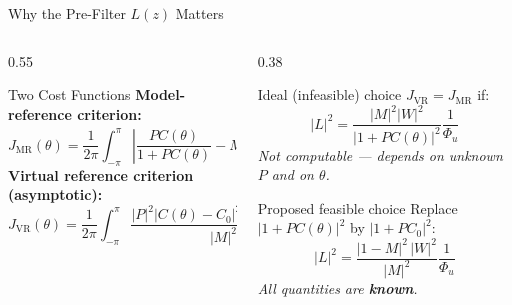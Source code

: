 \documentclass[hyperref={pdfpagemode=FullScreen},aspectratio=169]{beamer}
\begin{document}
\begin{frame}{Why the Pre-Filter $L(z)$ Matters}
  \begin{columns}[T]
    \begin{column}{0.55\textwidth}
      \begin{block}{Two Cost Functions}
        \textbf{Model-reference criterion:}
        \[
          J_{\mathrm{MR}}(\theta)=\frac{1}{2\pi}\!\int_{-\pi}^{\pi}
          \!\!\left|\frac{PC(\theta)}{1+PC(\theta)}-M\right|^2\!|W|^2 d\omega
        \]
        \vspace{0.2em}
        \textbf{Virtual reference criterion (asymptotic):}
        \[
          J_{\mathrm{VR}}(\theta)=\frac{1}{2\pi}\!\int_{-\pi}^{\pi}
          \!\!\frac{|P|^2|C(\theta)-C_0|^2|1-M|^2|L|^2}{|M|^2}\Phi_u\; d\omega
        \]
      \end{block}
    \end{column}
    \begin{column}{0.38\textwidth}
      \begin{exampleblock}{Ideal (infeasible) choice}
        $J_{\mathrm{VR}} = J_{\mathrm{MR}}$ if:
        \[ |L|^2 = \frac{|M|^2|W|^2}{|1+PC(\theta)|^2}\frac{1}{\Phi_u} \]
        \textit{Not computable — depends on unknown $P$ and on $\theta$.}
      \end{exampleblock}
      \vspace{0.4em}
      \begin{alertblock}{Proposed feasible choice}
        Replace $|1+PC(\theta)|^2$ by $|1+PC_0|^2$:
        \[
          \boxed{|L|^2 = \frac{|1-M|^2\,|W|^2}{|M|^2}\frac{1}{\Phi_u}}
        \]
        \textit{All quantities are \textbf{known}.}
      \end{alertblock}
    \end{column}
  \end{columns}
\end{frame}
\end{document}
